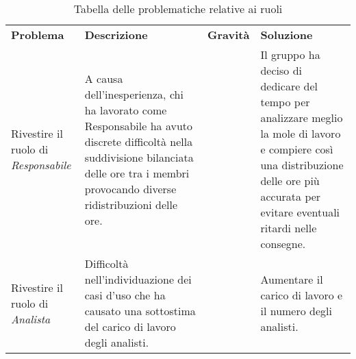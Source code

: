 \renewcommand{\arraystretch}{1.5}
\begin{longtable}{  >{\centering}p{} >{}p{}
    >{\centering}p{} >{}p{}}
    \caption{Tabella delle problematiche relative ai ruoli}	\\
    \rowcolor{\primaryColor}
    \textcolor{\secondaryColor}{
    \centering\textbf{Problema}}     & \textcolor{\secondaryColor}{\centering\textbf{Descrizione}}    & \textcolor{\secondaryColor}
    {\centering\textbf{Gravità}} & \textcolor{\secondaryColor}{\centering\textbf{Soluzione}}\\
   
    Rivestire il ruolo di \textit{Responsabile}  
    &  A causa dell'inesperienza, chi ha lavorato come Responsabile ha avuto discrete difficoltà nella suddivisione bilanciata delle ore tra i membri provocando diverse ridistribuzioni delle ore.
    & 2  
    & Il gruppo ha deciso di dedicare del tempo per analizzare meglio la mole di lavoro e compiere così una distribuzione delle ore più accurata per evitare eventuali ritardi nelle consegne. {} \\
    Rivestire il ruolo di \textit{Analista}
    & Difficoltà nell'individuazione dei casi d'uso che ha causato una sottostima del carico di lavoro degli analisti.
    & 3
    & Aumentare il carico di lavoro e il numero degli analisti. \\
    \end{longtable}
